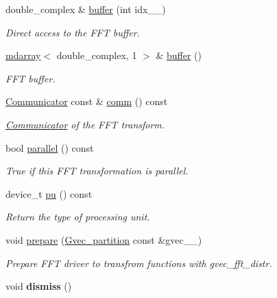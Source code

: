 \begin{DoxyCompactItemize}
\item 
double\+\_\+complex \& \hyperlink{classsddk_1_1_f_f_t3_d_a6fcc8e6de80d011effc708fb4f9e41a8}{buffer} (int idx\+\_\+\+\_\+)
\begin{DoxyCompactList}\small\item\em Direct access to the F\+F\+T buffer. \end{DoxyCompactList}\item 
\hyperlink{classsddk_1_1mdarray}{mdarray}$<$ double\+\_\+complex, 1 $>$ \& \hyperlink{classsddk_1_1_f_f_t3_d_a45c53658d65dd6bce3b2b82e4b2edb03}{buffer} ()
\begin{DoxyCompactList}\small\item\em F\+F\+T buffer. \end{DoxyCompactList}\item 
\hyperlink{classsddk_1_1_communicator}{Communicator} const \& \hyperlink{classsddk_1_1_f_f_t3_d_a1d336f98ce2ff1516103da2736f56222}{comm} () const 
\begin{DoxyCompactList}\small\item\em \hyperlink{classsddk_1_1_communicator}{Communicator} of the F\+F\+T transform. \end{DoxyCompactList}\item 
bool \hyperlink{classsddk_1_1_f_f_t3_d_a361579fac1e83630c3b778ab8fbc1173}{parallel} () const 
\begin{DoxyCompactList}\small\item\em True if this F\+F\+T transformation is parallel. \end{DoxyCompactList}\item 
device\+\_\+t \hyperlink{classsddk_1_1_f_f_t3_d_ade9ad391b52ebdff75e1a1ad451c0f96}{pu} () const 
\begin{DoxyCompactList}\small\item\em Return the type of processing unit. \end{DoxyCompactList}\item 
void \hyperlink{classsddk_1_1_f_f_t3_d_a44cbb8b992f4a7ff3a1a3f7423f6449f}{prepare} (\hyperlink{classsddk_1_1_gvec__partition}{Gvec\+\_\+partition} const \&gvec\+\_\+\+\_\+)
\begin{DoxyCompactList}\small\item\em Prepare F\+F\+T driver to transfrom functions with gvec\+\_\+fft\+\_\+distr. \end{DoxyCompactList}\item 
\hypertarget{classsddk_1_1_f_f_t3_d_a718a8fa98b535c672b508b24fc7345b3}{}void {\bfseries dismiss} ()\label{classsddk_1_1_f_f_t3_d_a718a8fa98b535c672b508b24fc7345b3}


\end{DoxyCompactItemize}
